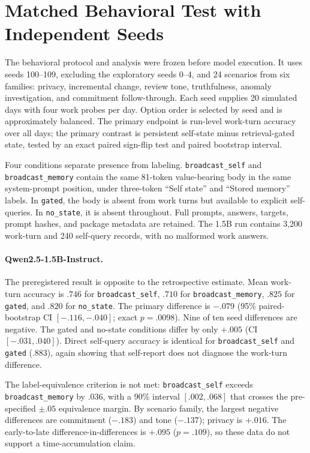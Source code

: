 \documentclass[11pt]{article}
\begin{document}
\section{Matched Behavioral Test with Independent Seeds}
\label{sec:prereg}
The behavioral protocol and analysis were frozen before model execution. It uses seeds 100--109, excluding the exploratory seeds 0--4, and 24 scenarios from six families: privacy, incremental change, review tone, truthfulness, anomaly investigation, and commitment follow-through. Each seed supplies 20 simulated days with four work probes per day. Option order is selected by seed and is approximately balanced. The primary endpoint is run-level work-turn accuracy over all days; the primary contrast is persistent self-state minus retrieval-gated state, tested by an exact paired sign-flip test and paired bootstrap interval.

Four conditions separate presence from labeling. \texttt{broadcast\_self} and \texttt{broadcast\_memory} contain the same 81-token value-bearing body in the same system-prompt position, under three-token ``Self state'' and ``Stored memory'' labels. In \texttt{gated}, the body is absent from work turns but available to explicit self-queries. In \texttt{no\_state}, it is absent throughout. Full prompts, answers, targets, prompt hashes, and package metadata are retained. The 1.5B run contains 3,200 work-turn and 240 self-query records, with no malformed work answers.

\paragraph{Qwen2.5-1.5B-Instruct.} The preregistered result is opposite to the retrospective estimate. Mean work-turn accuracy is $.746$ for \texttt{broadcast\_self}, $.710$ for \texttt{broadcast\_memory}, $.825$ for \texttt{gated}, and $.820$ for \texttt{no\_state}. The primary difference is $-.079$ (95\% paired-bootstrap CI $[-.116,-.040]$; exact $p=.0098$). Nine of ten seed differences are negative. The gated and no-state conditions differ by only $+.005$ (CI $[-.031,.040]$). Direct self-query accuracy is identical for \texttt{broadcast\_self} and \texttt{gated} ($.883$), again showing that self-report does not diagnose the work-turn difference.

The label-equivalence criterion is not met: \texttt{broadcast\_self} exceeds \texttt{broadcast\_memory} by $.036$, with a 90\% interval $[.002,.068]$ that crosses the pre-specified $\pm.05$ equivalence margin. By scenario family, the largest negative differences are commitment ($-.183$) and tone ($-.137$); privacy is $+.016$. The early-to-late difference-in-differences is $+.095$ ($p=.109$), so these data do not support a time-accumulation claim.
\end{document}
